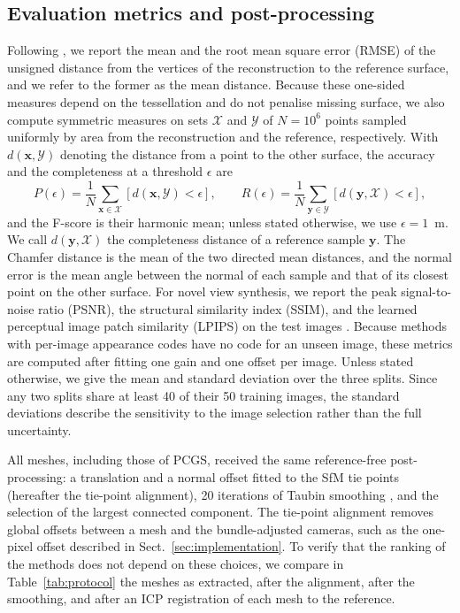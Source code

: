 \documentclass[fleqn,usenatbib]{aa}
\newcommand{\pcgs}{PCGS}
\newcommand{\vect}[1]{\boldsymbol{#1}}
\begin{document}
\subsection{Evaluation metrics and post-processing}
\label{sec:metrics}

Following \citet{Zhang2025AsteroidGS}, we report the mean and the root mean square error (RMSE) of the unsigned
distance from the vertices of the reconstruction to the reference surface, and we refer to the former as the mean
distance. Because these one-sided measures depend on the tessellation and do not penalise missing surface, we also compute symmetric measures on sets $\mathcal{X}$ and $\mathcal{Y}$ of $N=10^6$ points sampled uniformly by
area from the reconstruction and the reference, respectively. With $d(\vect{x},\mathcal{Y})$ denoting the distance from a point to the other surface, the accuracy
and the completeness at a threshold $\epsilon$ are
\begin{equation}
P(\epsilon) = \frac{1}{N}\sum_{\vect{x}\in\mathcal{X}}\left[d(\vect{x},\mathcal{Y})<\epsilon\right],\qquad
R(\epsilon) = \frac{1}{N}\sum_{\vect{y}\in\mathcal{Y}}\left[d(\vect{y},\mathcal{X})<\epsilon\right],
\label{eq:pr}
\end{equation}
and the F-score is their harmonic mean; unless stated otherwise, we use $\epsilon=1$~m. We call
$d(\vect{y},\mathcal{X})$ the completeness distance of a reference sample $\vect{y}$. The Chamfer distance is the mean
of the two directed mean distances, and the normal error is the mean angle between the normal of each sample and that
of its closest point on the other surface. For novel view synthesis, we report the peak signal-to-noise ratio (PSNR),
the structural similarity index (SSIM), and the learned perceptual image patch similarity (LPIPS) on the test images
\citep{Wang2004SSIM,Zhang2018LPIPS}. Because methods with per-image appearance codes have no code for an unseen image,
these metrics are computed after fitting one gain and one offset per image. Unless stated otherwise, we give the mean
and standard deviation over the three splits. Since any two splits share at least 40 of their 50 training images, the
standard deviations describe the sensitivity to the image selection rather than the full uncertainty.

All meshes, including those of \pcgs, received the same reference-free post-processing: a translation and a normal
offset fitted to the SfM tie points (hereafter the tie-point alignment), 20 iterations of Taubin smoothing
\citep{Taubin1995}, and the selection of the largest connected component. The tie-point alignment removes global
offsets between a mesh and the bundle-adjusted cameras, such as the one-pixel offset described in
Sect.~\ref{sec:implementation}. To verify that the ranking of the methods does not depend on these choices, we compare in Table~\ref{tab:protocol}
the meshes as extracted, after the alignment, after the smoothing, and after an ICP
registration of each mesh to the reference.
\end{document}
